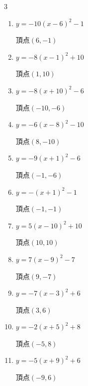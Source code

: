 \begin{multicols}{3}
\begin{enumerate}
        $\displaystyle 頂点\left( 2 , 8 \right)$

\columnbreak %

  \item $\displaystyle y=-10\left( x-6\right)^{2}-1$

        $\displaystyle 頂点\left( 6 , -1 \right)$

  \item $\displaystyle y=-8\left( x-1\right)^{2}+10$

        $\displaystyle 頂点\left( 1 , 10 \right)$

  \item $\displaystyle y=-8\left( x+10\right)^{2}-6$

        $\displaystyle 頂点\left( -10 , -6 \right)$

  \item $\displaystyle y=-6\left( x-8\right)^{2}-10$

        $\displaystyle 頂点\left( 8 , -10 \right)$

  \item $\displaystyle y=-9\left( x+1\right)^{2}-6$

        $\displaystyle 頂点\left( -1 , -6 \right)$

  \item $\displaystyle y=-\left( x+1\right)^{2}-1$

        $\displaystyle 頂点\left( -1 , -1 \right)$

  \item $\displaystyle y=5\left( x-10\right)^{2}+10$

        $\displaystyle 頂点\left( 10 , 10 \right)$

  \item $\displaystyle y=7\left( x-9\right)^{2}-7$

        $\displaystyle 頂点\left( 9 , -7 \right)$

  \item $\displaystyle y=-7\left( x-3\right)^{2}+6$

        $\displaystyle 頂点\left( 3 , 6 \right)$

  \item $\displaystyle y=-2\left( x+5\right)^{2}+8$

        $\displaystyle 頂点\left( -5 , 8 \right)$

  \item $\displaystyle y=-5\left( x+9\right)^{2}+6$

        $\displaystyle 頂点\left( -9 , 6 \right)$


\end{enumerate}
\end{multicols}
